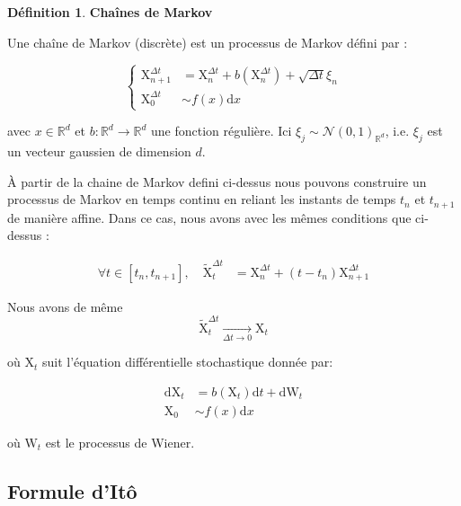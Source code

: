 \documentclass[11pt]{article}
\theoremstyle{definition}
\newtheorem{definition}{Définition}[section]
\theoremstyle{remark}
\begin{document}
\begin{definition}{\textbf{Chaînes de Markov}}

Une chaîne de Markov (discrète) est un processus de Markov défini par :

\begin{equation}
\left\{ 
  \begin{array}{ll}
  \mathrm{X}_{n+1}^{\Delta t} &= \mathrm{X}_{n}^{\Delta t} + b(\mathrm{X}_{n}^{\Delta t}) + \sqrt{\Delta t} \xi_{n}
  \\
  \mathrm{X}_{0}^{\Delta t} &\sim  f(x) \mathrm{d}x 
  \end{array}
\right.
\end{equation}



avec $x \in \mathbb{R}^d$ et $b: \mathbb{R}^d \to \mathbb{R}^d$ une fonction régulière. Ici $\xi_{j} \sim \mathcal{N}(0,1)_{\mathbb{R}^d}$, i.e. $\xi_{j}$ est un vecteur gaussien de dimension $d$. 
\end{definition}

À partir de la chaine de Markov defini ci-dessus nous pouvons construire un processus de Markov en temps continu en reliant les instants de temps $t_n$ et $t_{n+1}$ de manière affine. Dans ce cas, nous avons avec les mêmes conditions que ci-dessus :

\begin{align}
\forall t \in [t_n,t_{n+1}],\quad\tilde{\mathrm{X}}_{t}^{\Delta t} &= \mathrm{X}_{n}^{\Delta t} + (t-t_n) \mathrm{X}_{n+1}^{\Delta t} 
\end{align}

Nous avons de même 
\begin{equation}
\tilde{\mathrm{X}}_{t}^{\Delta t} \underset{\Delta t \to 0}{\longrightarrow} \mathrm{X}_t
\end{equation}


où $\mathrm{X}_{t}$ suit l’équation différentielle stochastique donnée par: 

\begin{align}
\label{equ_stoch_x}
\mathrm{dX}_{t} &= b(\mathrm{X}_{t})\mathrm{d}t + \mathrm{dW}_{t} \\
\mathrm{X}_{0} &\sim f(x)\mathrm{d}x
\end{align}

où $\mathrm{W}_{t}$ est le processus de Wiener.

\subsection{Formule d'Itô}
\end{document}
